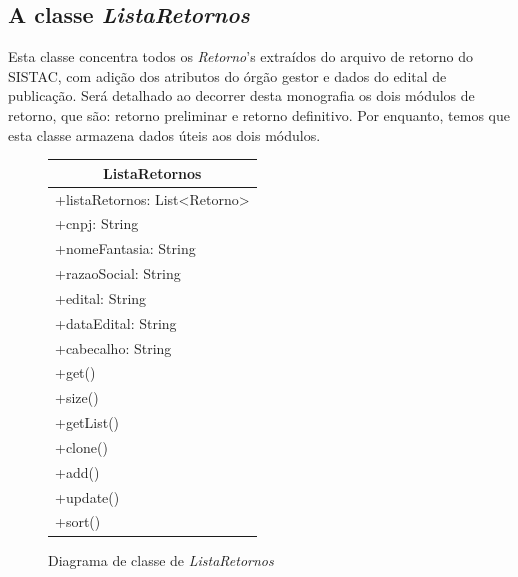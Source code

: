\documentclass[
	12pt,			%
	openright,		%
	oneside,	
	a4paper,		%
	english,		%
	brazil			%
]{abntex2/abntex2}  %
\begin{document}
			\subsection{A classe \textit{ListaRetornos}}

				Esta classe concentra todos os \textit{Retorno}'s extraídos do arquivo de retorno do SISTAC, com adição dos atributos do órgão gestor e dados do edital de publicação. Será detalhado ao decorrer desta monografia os dois módulos de retorno, que são: retorno preliminar e retorno definitivo. Por enquanto, temos que esta classe armazena dados úteis aos dois módulos.

				\begin{figure}[ht]
					\begin{center}
						
						\caption{Diagrama de classe de \textit{ListaRetornos}}
						\label{listaretornos-uml}
						
						\begin{tabular}{|l|}
							\hline
							\multicolumn{1}{|c|}{\textbf{ListaRetornos}}         \\ \hline
							+listaRetornos: List\textless{}Retorno\textgreater{} \\
							+cnpj: String                                        \\
							+nomeFantasia: String                                \\
							+razaoSocial: String                                 \\
							+edital: String                                      \\
							+dataEdital: String                                  \\
							+cabecalho: String                                   \\ \hline
							+get()                                               \\
							+size()                                              \\
							+getList()                                           \\
							+clone()                                             \\
							+add()                                               \\
							+update()                                            \\
							+sort()                                              \\ \hline
						\end{tabular}
						
					\end{center}
				\end{figure}
	
\end{document}
